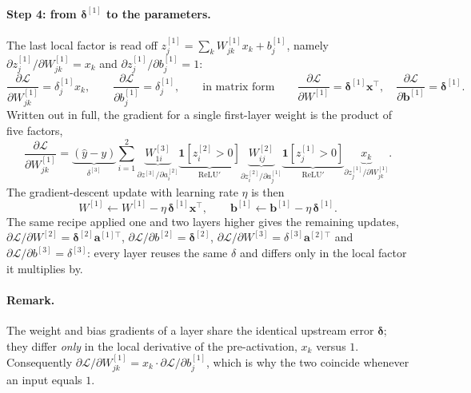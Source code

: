 \documentclass[11pt,a4paper]{article}
\begin{document}
\paragraph{Step 4: from $\boldsymbol{\delta}^{[1]}$ to the parameters.} The last local factor
is read off $z^{[1]}_j=\sum_k W^{[1]}_{jk}x_k+b^{[1]}_j$, namely
$\partial z^{[1]}_j/\partial W^{[1]}_{jk}=x_k$ and $\partial z^{[1]}_j/\partial b^{[1]}_j=1$:
\begin{equation}
\frac{\partial\mathcal{L}}{\partial W^{[1]}_{jk}}=\delta^{[1]}_j x_k,
\qquad
\frac{\partial\mathcal{L}}{\partial b^{[1]}_j}=\delta^{[1]}_j,
\qquad\text{in matrix form}\qquad
\frac{\partial\mathcal{L}}{\partial W^{[1]}}=\boldsymbol{\delta}^{[1]}\mathbf{x}^\top,
\quad
\frac{\partial\mathcal{L}}{\partial \mathbf{b}^{[1]}}=\boldsymbol{\delta}^{[1]}.
\end{equation}
Written out in full, the gradient for a single first-layer weight is the product of five
factors,
\begin{equation}
\frac{\partial\mathcal{L}}{\partial W^{[1]}_{jk}}
=\underbrace{(\hat{y}-y)}_{\delta^{[3]}}
\sum_{i=1}^{2}
\underbrace{W^{[3]}_{1i}}_{\partial z^{[3]}/\partial a^{[2]}_i}
\underbrace{\mathbf{1}[z^{[2]}_i>0]}_{\mathrm{ReLU}'}
\underbrace{W^{[2]}_{ij}}_{\partial z^{[2]}_i/\partial a^{[1]}_j}
\underbrace{\mathbf{1}[z^{[1]}_j>0]}_{\mathrm{ReLU}'}
\underbrace{x_k}_{\partial z^{[1]}_j/\partial W^{[1]}_{jk}} .
\end{equation}
The gradient-descent update with learning rate $\eta$ is then
\begin{equation}
W^{[1]}\leftarrow W^{[1]}-\eta\,\boldsymbol{\delta}^{[1]}\mathbf{x}^\top,
\qquad
\mathbf{b}^{[1]}\leftarrow \mathbf{b}^{[1]}-\eta\,\boldsymbol{\delta}^{[1]} .
\end{equation}
The same recipe applied one and two layers higher gives the remaining updates,
$\partial\mathcal{L}/\partial W^{[2]}=\boldsymbol{\delta}^{[2]}\mathbf{a}^{[1]\top}$,
$\partial\mathcal{L}/\partial b^{[2]}=\boldsymbol{\delta}^{[2]}$,
$\partial\mathcal{L}/\partial W^{[3]}=\delta^{[3]}\mathbf{a}^{[2]\top}$ and
$\partial\mathcal{L}/\partial b^{[3]}=\delta^{[3]}$: every layer reuses the same
$\delta$ and differs only in the local factor it multiplies by.

\paragraph{Remark.} The weight and bias gradients of a layer share the identical upstream
error $\boldsymbol{\delta}$; they differ \emph{only} in the local derivative of the
pre-activation, $x_k$ versus $1$. Consequently
$\partial\mathcal{L}/\partial W^{[1]}_{jk}=x_k\cdot\partial\mathcal{L}/\partial b^{[1]}_j$,
which is why the two coincide whenever an input equals $1$.
\end{document}
